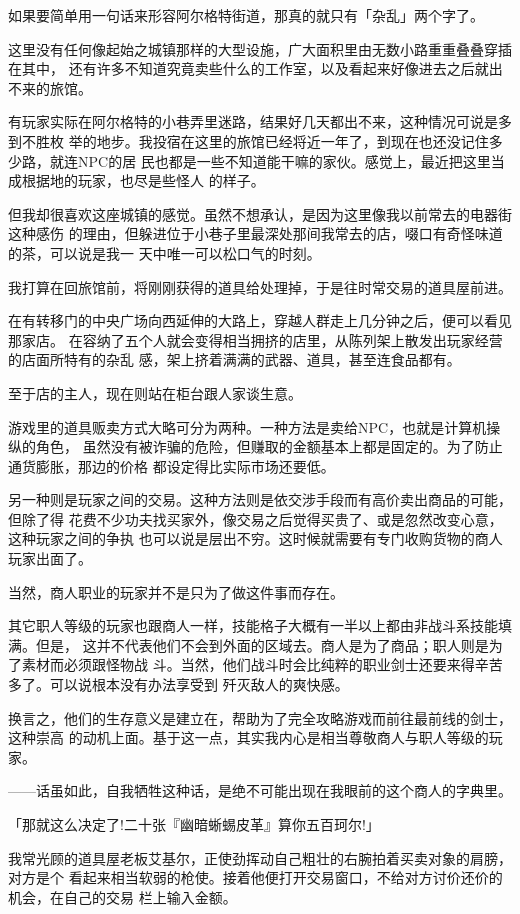 \documentclass[11pt]{book}
\begin{document}
如果要简单用一句话来形容阿尔格特街道，那真的就只有「杂乱」两个字了。

这里没有任何像起始之城镇那样的大型设施，广大面积里由无数小路重重叠叠穿插在其中，
还有许多不知道究竟卖些什么的工作室，以及看起来好像进去之后就出不来的旅馆。

有玩家实际在阿尔格特的小巷弄里迷路，结果好几天都出不来，这种情况可说是多到不胜枚
举的地步。我投宿在这里的旅馆已经将近一年了，到现在也还没记住多少路，就连NPC的居
民也都是一些不知道能干嘛的家伙。感觉上，最近把这里当成根据地的玩家，也尽是些怪人
的样子。

但我却很喜欢这座城镇的感觉。虽然不想承认，是因为这里像我以前常去的电器街这种感伤
的理由，但躲进位于小巷子里最深处那间我常去的店，啜口有奇怪味道的茶，可以说是我一
天中唯一可以松口气的时刻。

我打算在回旅馆前，将刚刚获得的道具给处理掉，于是往时常交易的道具屋前进。

在有转移门的中央广场向西延伸的大路上，穿越人群走上几分钟之后，便可以看见那家店。
在容纳了五个人就会变得相当拥挤的店里，从陈列架上散发出玩家经营的店面所特有的杂乱
感，架上挤着满满的武器、道具，甚至连食品都有。

至于店的主人，现在则站在柜台跟人家谈生意。

游戏里的道具贩卖方式大略可分为两种。一种方法是卖给NPC，也就是计算机操纵的角色，
虽然没有被诈骗的危险，但赚取的金额基本上都是固定的。为了防止通货膨胀，那边的价格
都设定得比实际市场还要低。

另一种则是玩家之间的交易。这种方法则是依交涉手段而有高价卖出商品的可能，但除了得
花费不少功夫找买家外，像交易之后觉得买贵了、或是忽然改变心意，这种玩家之间的争执
也可以说是层出不穷。这时候就需要有专门收购货物的商人玩家出面了。

当然，商人职业的玩家并不是只为了做这件事而存在。

其它职人等级的玩家也跟商人一样，技能格子大概有一半以上都由非战斗系技能填满。但是，
这并不代表他们不会到外面的区域去。商人是为了商品；职人则是为了素材而必须跟怪物战
斗。当然，他们战斗时会比纯粹的职业剑士还要来得辛苦多了。可以说根本没有办法享受到
歼灭敌人的爽快感。

换言之，他们的生存意义是建立在，帮助为了完全攻略游戏而前往最前线的剑士，这种崇高
的动机上面。基于这一点，其实我内心是相当尊敬商人与职人等级的玩家。

——话虽如此，自我牺牲这种话，是绝不可能出现在我眼前的这个商人的字典里。

「那就这么决定了!二十张『幽暗蜥蜴皮革』算你五百珂尔!」

我常光顾的道具屋老板艾基尔，正使劲挥动自己粗壮的右腕拍着买卖对象的肩膀，对方是个
看起来相当软弱的枪使。接着他便打开交易窗口，不给对方讨价还价的机会，在自己的交易
栏上输入金额。
\end{document}
